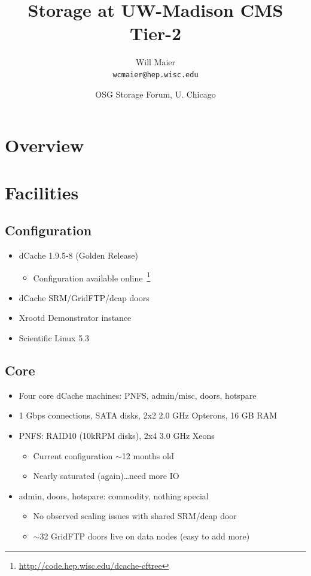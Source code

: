 \documentclass{beamer}
\title{Storage at UW-Madison CMS Tier-2}
\author[Maier]{
    Will Maier \\ 
    {\tt wcmaier@hep.wisc.edu}}
\institute[Wisconsin]{University of Wisconsin - High Energy Physics}
\date[2010.09.22]{OSG Storage Forum, U. Chicago}
\newcommand{\ca}{\ensuremath{\sim}}
\begin{document}

\begin{frame}
    \titlepage
\end{frame}

\section{Overview}
\begin{frame}
    \tableofcontents
\end{frame}

\section{Facilities}
\subsection{Configuration}
\begin{frame}
\begin{itemize}
	\item dCache 1.9.5-8 (Golden Release)
	\begin{itemize}
		\item Configuration available online~\footnote{\url{http://code.hep.wisc.edu/dcache-cftree}}
	\end{itemize}
	\item dCache SRM/GridFTP/dcap doors
	\item Xrootd Demonstrator instance
	\item Scientific Linux 5.3
\end{itemize}
\end{frame}

\subsection{Core}
\begin{frame}
\begin{itemize}
	\item Four core dCache machines: PNFS, admin/misc, doors, hotspare
	\item 1 Gbps connections, SATA disks, 2x2 2.0 GHz Opterons, 16 GB RAM
	\item PNFS: RAID10 (10kRPM disks), 2x4 3.0 GHz Xeons
	\begin{itemize}
		\item Current configuration \ca{}12 months old
		\item Nearly saturated (again)\ldots{}need more IO
	\end{itemize}
	\item admin, doors, hotspare: commodity, nothing special
	\begin{itemize}
		\item No observed scaling issues with shared SRM/dcap door
		\item \ca{}32 GridFTP doors live on data nodes (easy to add more)
	\end{itemize}
\end{itemize}
\end{frame}
\end{document}
